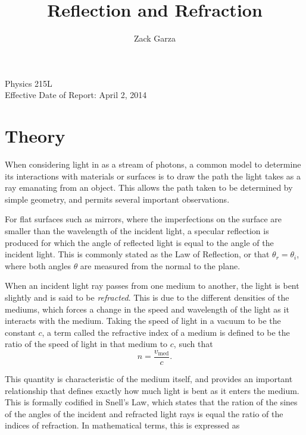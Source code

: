 \documentclass[twocolumn,english]{IEEEtran}
\theoremstyle{plain}
\theoremstyle{plain}
\begin{document}
\title{Reflection and Refraction}


\author{Zack Garza}


\IEEEspecialpapernotice
{Physics 215L \\
Effective Date of Report: April 2, 2014}


\maketitle

\tableofcontents


\section{Theory}

When considering light in as a stream of photons, a common model to determine its interactions with materials or surfaces is to draw the path the light takes as a ray emanating from an object. This allows the path taken to be determined by simple geometry, and permits several important observations.

For flat surfaces such as mirrors, where the imperfections on the surface are smaller than the wavelength of the incident light, a specular reflection is produced for which the angle of reflected light is equal to the angle of the incident light. This is commonly stated as the Law of Reflection, or that $\theta_{r} = \theta_i$, where both angles $\theta$ are measured from the normal to the plane.

When an incident light ray passes from one medium to another, the light is bent slightly and is said to be \textit{refracted}. This is due to the different densities of the mediums, which forces a change in the speed and wavelength of the light as it interacts with the medium. Taking the speed of light in a vacuum to be the constant $c$, a term called the refractive index of a medium is defined to be the ratio of the speed of light in that medium to $c$, such that
\begin{equation}
n = \frac{v_{\text{med}}}{c}.
\end{equation}


This quantity is characteristic of the medium itself, and provides an important relationship that defines exactly how much light is bent as it enters the medium. This is formally codified in Snell's Law, which states that the ration of the sines of the angles of the incident and refracted light rays is equal the ratio of the indices of refraction. In mathematical terms, this is expressed as
\end{document}

